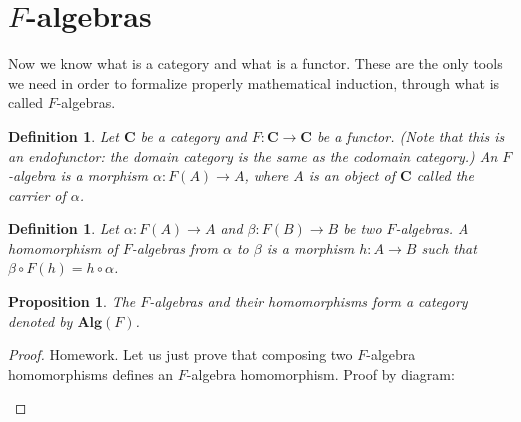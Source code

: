 \documentclass[11pt,a4paper]{article}
\newtheorem{defi}[theo]{Definition}
\newtheorem{prop}[theo]{Proposition}
\newcommand{\gr}{\textbf}
\newcommand{\1}{\mathbbm{1}}
\begin{document}
\section{$F$-algebras}
Now we know what is a category and what is a functor. These are the only tools we need in order to formalize properly mathematical induction, through what is called $F$-algebras.
\begin{defi}
Let $\gr{C}$ be a category and $F : \gr{C} \to \gr{C}$ be a functor. (Note that this is an endofunctor: the domain category is the same as the codomain category.) An $F$-algebra is a morphism $\alpha : F(A) \to A$, where $A$ is an object of $\gr{C}$ called the carrier of $\alpha$.
\end{defi}
\begin{defi} Let $\alpha : F(A) \to A$ and $\beta : F(B) \to B$ be two $F$-algebras. A homomorphism of $F$-algebras from $\alpha$ to $\beta$ is a morphism $h : A \to B$ such that $\beta \circ F(h) = h \circ \alpha$.
\end{defi}
\begin{center}
\end{center}
\begin{prop}
The $F$-algebras and their homomorphisms form a category denoted by $\gr{Alg}(F)$.
\end{prop}
\begin{proof}[Proof] Homework. Let us just prove that composing two $F$-algebra homomorphisms defines an $F$-algebra homomorphism. Proof by diagram:
\begin{center}
\end{center}
\end{proof}
\end{document}
